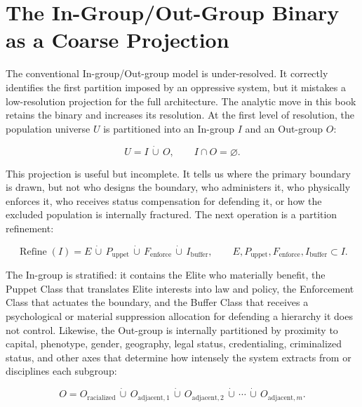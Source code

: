 \section{The In-Group/Out-Group Binary as a Coarse Projection}
\label{sec:binary-refinement}

The conventional In-group/Out-group model is under-resolved.
It correctly identifies the first partition imposed by an oppressive system, but
it mistakes a low-resolution projection for the full architecture. The analytic move in this book retains the binary and increases its resolution.
At the first level of resolution, the population universe $U$ is partitioned into
an In-group $I$ and an Out-group $O$:

\begin{equation}\label{eq:binary-partition}
U = I \,\dot\cup\, O,
\qquad
I \cap O = \varnothing .
\end{equation}

This projection is useful but incomplete. It tells us where the primary
boundary is drawn, but not who designs the boundary, who administers it, who
physically enforces it, who receives status compensation for defending it, or
how the excluded population is internally fractured. The next operation is a
partition refinement:

\begin{equation}\label{eq:refined-five-tier-partition}
\operatorname{Refine}(I)
=
E \,\dot\cup\, P_{\text{uppet}} \,\dot\cup\, F_{\text{enforce}}
\,\dot\cup\, I_{\text{buffer}},
\qquad
E, P_{\text{uppet}}, F_{\text{enforce}}, I_{\text{buffer}} \subset I .
\end{equation}

The In-group is stratified: it contains the
Elite who materially benefit, the Puppet Class that translates Elite interests
into law and policy, the Enforcement Class that actuates the boundary, and the
Buffer Class that receives a psychological or material suppression allocation
for defending a hierarchy it does not control. Likewise, the Out-group is internally partitioned by proximity to
capital, phenotype, gender, geography, legal status, credentialing, criminalized
status, and other axes that determine how intensely the system extracts from or
disciplines each subgroup:

\begin{equation}\label{eq:outgroup-internal-partition}
O
=
O_{\text{racialized}} \,\dot\cup\, O_{\text{adjacent},1}
\,\dot\cup\, O_{\text{adjacent},2}
\,\dot\cup\, \cdots \,\dot\cup\, O_{\text{adjacent},m}.
\end{equation}

